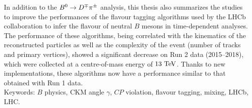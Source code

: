 In addition to the $B^0\rightarrow D^\mp\pi^\pm$ analysis, this thesis also summarizes the studies to improve the
performances of the flavour tagging algorithms used by the LHCb collaboration to infer 
the flavour of neutral $B$ mesons in time-dependent analyses.
The performance of these algorithms, being correlated with the kinematics of the reconstructed particles 
as well as the complexity of the event (number of tracks and primary vertices), showed a significant
decrease on Run 2 data (2015--2018), which were collected at a centre-of-mass energy of $13~\rm TeV$. 
Thanks to new implementations, these algorithms now have a performance similar to that
obtained with Run 1 data. \\   

Keywords: $B$ physics, CKM angle $\gamma$, $CP$ violation, flavour tagging, mixing, LHCb, LHC.

